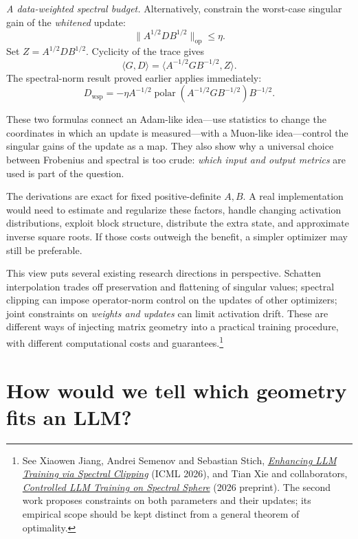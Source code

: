 \emph{A data-weighted spectral budget.}  Alternatively, constrain the worst-case singular gain of the \emph{whitened} update:
\begin{equation}
 \|A^{1/2}DB^{1/2}\|_{\mathrm{op}}\leq\eta.
 \label{eq:N20261017-weighted-spectral-ball}
\end{equation}
Set \(Z=A^{1/2}DB^{1/2}\).  Cyclicity of the trace gives
\[
 \langle G,D\rangle
 =\langle A^{-1/2}GB^{-1/2},Z\rangle.
\]
The spectral-norm result proved earlier applies immediately:
\begin{equation}
 D_{\mathrm{wsp}}=
 -\eta A^{-1/2}
  \operatorname{polar}(A^{-1/2}GB^{-1/2})
  B^{-1/2}.
 \label{eq:N20261017-weighted-spectral-update}
\end{equation}

These two formulas connect an Adam-like idea---use statistics to change the coordinates in which an update is measured---with a Muon-like idea---control the singular gains of the update as a map.  They also show why a universal choice between Frobenius and spectral is too crude: \emph{which input and output metrics} are used is part of the question.

The derivations are exact for fixed positive-definite \(A,B\).  A real implementation would need to estimate and regularize these factors, handle changing activation distributions, exploit block structure, distribute the extra state, and approximate inverse square roots.  If those costs outweigh the benefit, a simpler optimizer may still be preferable.

This view puts several existing research directions in perspective.  Schatten interpolation trades off preservation and flattening of singular values; spectral clipping can impose operator-norm control on the updates of other optimizers; joint constraints on \emph{weights and updates} can limit activation drift.  These are different ways of injecting matrix geometry into a practical training procedure, with different computational costs and guarantees.\footnote{See Xiaowen Jiang, Andrei Semenov and Sebastian Stich, \href{https://proceedings.mlr.press/v306/jiang26am.html}{\emph{Enhancing LLM Training via Spectral Clipping}} (ICML 2026), and Tian Xie and collaborators, \href{https://arxiv.org/abs/2601.08393}{\emph{Controlled LLM Training on Spectral Sphere}} (2026 preprint).  The second work proposes constraints on both parameters and their updates; its empirical scope should be kept distinct from a general theorem of optimality.}

\section{How would we tell which geometry fits an LLM?}

